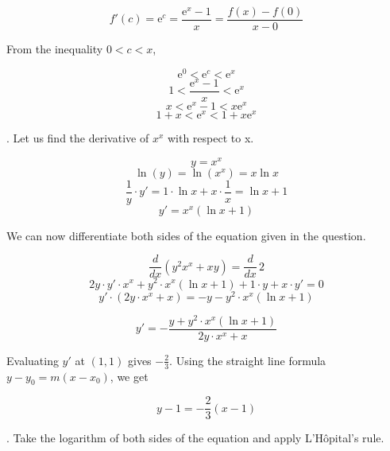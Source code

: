 \documentclass{article}
\begin{document}
\[
f'(c) = \mathrm{e}^c=\frac{\mathrm{e}^x-1}x=\frac{f(x)-f(0)}{x-0}
\]

\hfill

\noindent From the inequality $0<c<x$,

\[\mathrm{e}^0<\mathrm{e}^c<\mathrm{e}^x\]
\[1<\frac{\mathrm{e}^x-1}x<\mathrm{e}^x\]
\[x<\mathrm{e}^x-1 <x\mathrm{e}^x\]
\[1+x<\mathrm{e}^x <1+x\mathrm{e}^x\]

\hfill

. Let us find the derivative of $x^x$ with respect to x.

\[y=x^x\]
\[\ln(y)=\ln(x^x) = x\ln x\]
\[\frac1y\cdot y'=1\cdot\ln x + x\cdot \frac1x = \ln x +1\]
\[y'=x^x(\ln x+1)\]

\hfill

\noindent We can now differentiate both sides of the equation given in the question.

\[\frac d{dx}\left(y^2x^x + xy\right) = \frac d{dx}\,2\]
\[2y\cdot y'\cdot x^x + y^2\cdot x^x(\ln x+1)+1\cdot y +x\cdot y'=0\]
\[y'\cdot\left(2y\cdot x^x + x\right)=-y-y^2\cdot x^x(\ln x+1)\]

\[y'=-\frac{y+y^2\cdot x^x(\ln x+1)}{2y\cdot x^x+x}\]

\hfill

\noindent Evaluating $y'$ at $(1,1)$ gives $\displaystyle-\frac23$. Using the straight line formula $y-y_0 = m(x-x_0)$, we get

\[
\boxed{y-1 =-\frac23(x-1)}
\]

\newpage

. Take the logarithm of both sides of the equation and apply L'Hôpital's rule.
\end{document}
